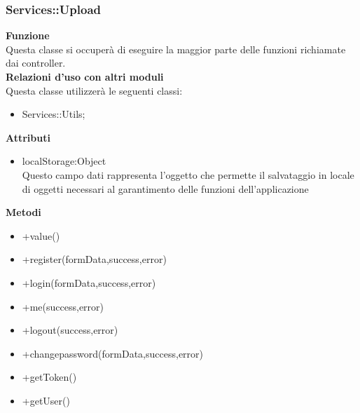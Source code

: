 \subsubsection{Services::Upload}
		\label{sub:servicesMain}
		\textbf{Funzione}\\
		\indent Questa classe si occuperà di eseguire la maggior parte delle funzioni richiamate dai controller.\\
		\textbf{Relazioni d'uso con altri moduli}\\
		\indent Questa classe utilizzerà le seguenti classi:
		\begin{itemize}
		\item Services::Utils;
		\end{itemize}
		\textbf{Attributi}\\
		\begin{itemize}
		\item localStorage:Object\\
		Questo campo dati rappresenta l’oggetto che permette il salvataggio in locale di oggetti necessari al garantimento delle funzioni dell'applicazione
		\end{itemize}
		\textbf{Metodi}
		\begin{itemize}
		\item +value()
		\item +register(formData,success,error)
		\item +login(formData,success,error)
		\item +me(success,error)
		\item +logout(success,error)
		\item +changepassword(formData,success,error)
		\item +getToken()
		\item +getUser()

		\end{itemize} 

